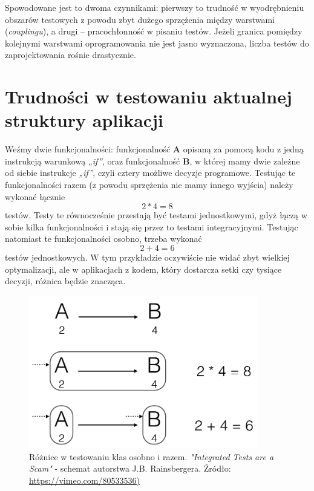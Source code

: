 Spowodowane jest to dwoma czynnikami: pierwszy to trudność w wyodrębnieniu obszarów testowych z powodu zbyt dużego sprzężenia między warstwami (\textit{couplingu}), a drugi – pracochłonność w pisaniu testów. Jeżeli granica pomiędzy kolejnymi warstwami oprogramowania nie jest jasno wyznaczona, liczba testów do zaprojektowania rośnie drastycznie.

\section{Trudności w testowaniu aktualnej struktury aplikacji}
\label{testowanie_starej_struktury}

Weźmy dwie funkcjonalności: funkcjonalność \textbf{A} opisaną za pomocą kodu z jedną instrukcją warunkową \textit{„if”}, oraz funkcjonalność \textbf{B}, w której mamy dwie zależne od siebie instrukcje \textit{„if”}, czyli cztery możliwe decyzje programowe. Testując te funkcjonalności razem (z powodu sprzężenia nie mamy innego wyjścia) należy wykonać łącznie 
\[2*4=8\]
testów. Testy te równocześnie przestają być testami jednostkowymi, gdyż łączą w sobie kilka funkcjonalności i stają się przez to testami integracyjnymi. Testując natomiast te funkcjonalności osobno, trzeba wykonać 
\[2+4=6\]
testów jednostkowych. W tym przykładzie oczywiście nie widać zbyt wielkiej optymalizacji, ale w aplikacjach z kodem, który dostarcza setki czy tysiące decyzji, różnica będzie znacząca.

\begin{figure}[!htb]
    \centering
    \includegraphics[width=10cm]{imgs/ch3_przyklad_testowania_klas.png}
    \caption
{Różnice w testowaniu klas osobno i razem. \textit{"Integrated Tests are a Scam"} - schemat autorstwa J.B. Rainsbergera. Źródło: \url{https://vimeo.com/80533536)}}
    \label{fig:testowanie_klas}
\end{figure} 

